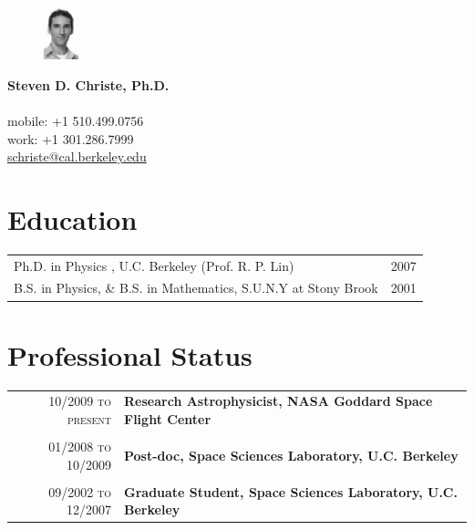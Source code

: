 \documentclass[11pt]{article}
\makeatletter
\newcommand{\name}[1]{\LARGE\textbf{#1}}
\newcommand{\address}[1]{\small{\color{lgray}{#1}}}
\newcommand{\tel}[1]{\small{#1}}
\newcommand{\email}[1]{\href{mailto:#1}{\small{#1}}}
\newcommand{\web}[2]{\href{#1}{\small{#2}}}
\newenvironment{ftabular}[1]
{\begin{tabular*}{0.95\textwidth}{@{\extracolsep{\fill}}#1}}
{\end{tabular*}}
\makeatother
\begin{document}
\vspace{-2.5in}
\begin{figure}
\includegraphics[width=0.09\textwidth]{mugshot.jpg}
\end{figure}


\name{Steven D. Christe, Ph.D.} \\
\address{Solar Physics Laboratory, Heliophysics Division \\
NASA Goddard Space Flight Center, Greenbelt, MD} \\
\tel{mobile: +1 510.499.0756}\\
\tel{work: +1 301.286.7999} \\
\email{schriste@cal.berkeley.edu}

\section{Education}
\begin{ftabular}{lr}
Ph.D. in Physics , U.C. Berkeley (Prof. R. P. Lin) & \textsc{2007}\\
B.S. in Physics, \& B.S. in Mathematics, S.U.N.Y at Stony Brook & \textsc{2001}\\
\end{ftabular}

\section{Professional Status}
\begin{ftabular}{r|p{14cm}}
\textsc{10/2009 to present} & \textbf{Research Astrophysicist, NASA Goddard Space Flight Center} \\

\multicolumn{2}{c}{ } \\ %

\textsc{01/2008 to 10/2009} & \textbf{Post-doc, Space Sciences Laboratory, U.C. Berkeley}\\

\multicolumn{2}{c}{ } \\ %

\textsc{09/2002 to 12/2007} & \textbf{Graduate Student, Space Sciences Laboratory, U.C. Berkeley}\end{ftabular}
\end{document}
